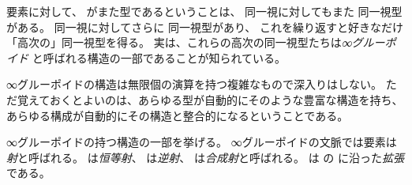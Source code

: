 \documentclass[index]{subfiles}
\begin{document}

要素に対して、
がまた型であるということは、
同一視に対してもまた
同一視型がある。
同一視に対してさらに
同一視型があり、
これを繰り返すと好きなだけ「高次の」同一視型を得る。
実は、これらの高次の同一視型たちは\emph{∞グルーポイド}
と呼ばれる構造の一部であることが知られている。

∞グルーポイドの構造は無限個の演算を持つ複雑なもので深入りはしない。
ただ覚えておくとよいのは、あらゆる型が自動的にそのような豊富な構造を持ち、
あらゆる構成が自動的にその構造と整合的になるということである。

∞グルーポイドの持つ構造の一部を挙げる。
∞グルーポイドの文脈では要素は
\emph{射}と呼ばれる。
は\emph{恒等射}、
は\emph{逆射}、
は\emph{合成射}と呼ばれる。
は
の
に沿った\emph{拡張}である。





\end{document}
